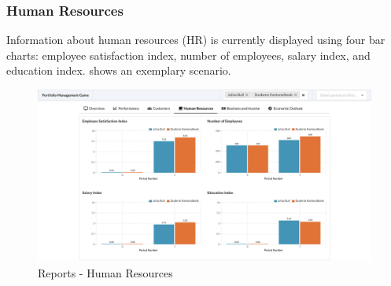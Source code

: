 \subsubsection{Human Resources}
Information about human resources (HR) is currently displayed using four bar charts: employee satisfaction index, number of employees, salary index, and education index.  shows an exemplary scenario.
\begin{figure}[h!]
  \centering
  \includegraphics[scale=0.2]{img/application-overview/reports/04_hr.png}
  \caption{Reports - Human Resources}
  \label{fig:reports_hr}
\end{figure}

